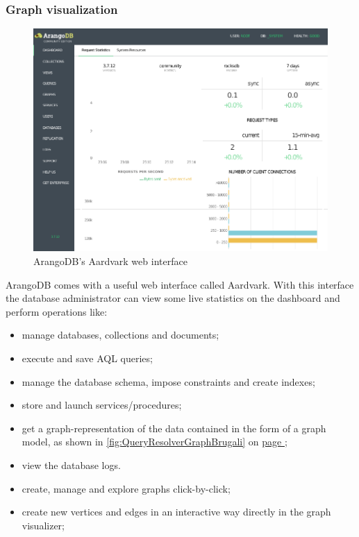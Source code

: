 \subsubsection{Graph visualization}\label{subsubsection:LiteratureReview/ReviewofGraphDatabaseSystems/AGDBMSindetailArangoDB/Graphvisualization}
\begin{figure}[H]%
	\centering%
	\includegraphics[width=1\textwidth]{images/chapter2/arangodbwebinterfacenew.pdf}%
	\caption[ArangoDB's Aardvark web interface]{ArangoDB's Aardvark web interface}%
	\label{fig:arangodbwebinterfacenew}%
\end{figure}%

ArangoDB comes with a useful web interface called Aardvark.
With this interface the database administrator can view some live statistics on the dashboard and perform operations like:
 \begin{itemize}[noitemsep]
	\item manage databases, collections and documents;
	\item execute and save \acrshort{AQL} queries;
	\item manage the database schema, impose constraints and create indexes;
	\item store and launch services/procedures;
	\item get a graph-representation of the data contained in the form of a graph model, as shown in \hyperref[fig:QueryResolverGraphBrugali]{\autoref{fig:QueryResolverGraphBrugali}} on \hyperref[fig:QueryResolverGraphBrugali]{page \pageref*{fig:QueryResolverGraphBrugali}};
	\item view the database logs.
	\item create, manage and explore graphs click-by-click;
	\item create new vertices and edges in an interactive way directly in the graph visualizer;
\end{itemize}

